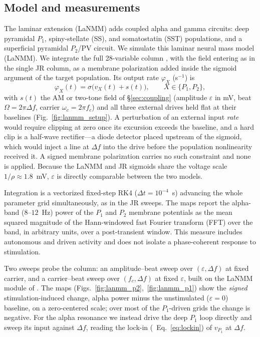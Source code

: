 \documentclass[11pt,a4paper]{article}
\newif\ifsupp
\newcommand{\Sig}{\sigma}
\begin{document}
\subsection{Model and measurements}\label{sec:lanmm-methods}
The laminar extension (LaNMM)
\cite{ruffini2025cfc,sanchezTodo2023} adds coupled alpha and gamma circuits: deep
pyramidal $P_1$, spiny-stellate (SS), and somatostatin (SST) populations, and a
superficial pyramidal $P_2$/PV circuit.
We simulate this laminar neural mass model (LaNMM). We integrate the full 28-variable column
\cite{ruffini2025cfc,sanchezTodo2023}, with the field entering as in the single
JR column, as a membrane polarization added inside the sigmoid argument of the target
population. Its output rate $\varphi_X$ (s$^{-1}$) is
\begin{equation}
\varphi_X(t)=\Sig\!\big(v_X(t)+s(t)\big),\qquad X\in\{P_1,P_2\},
\label{eq:lanmm_drive}
\end{equation}
with $s(t)$ the AM or two-tone field of \S\ref{sec:coupling} (amplitude $\varepsilon$ in
mV, beat $\Omega=2\pi\Delta f$, carrier $\omega_c=2\pi f_c$) and all three external drives
held flat at their baselines (Fig.~\ref{fig:lanmm_setup}). A perturbation of an external
input \emph{rate} would require clipping at zero
once its excursion exceeds the baseline, and a hard clip is a half-wave rectifier---a
diode detector placed upstream of the sigmoid, which would inject a line at $\Delta f$
into the drive before the population nonlinearity received it. A signed membrane
polarization carries no such constraint and none is applied. Because the LaNMM and JR
sigmoids share the voltage scale $1/\rho\approx1.8$~mV, $\varepsilon$ is directly
comparable between the two models.

Integration is a vectorized fixed-step RK4
($\Delta t=10^{-4}$~s) advancing the whole parameter grid simultaneously, as in the JR
sweeps. The maps report the
alpha-band ($8$--$12$~Hz) power of the $P_1$ and $P_2$ membrane potentials as the mean
squared magnitude of the Hann-windowed fast Fourier transform (FFT) over the band, in arbitrary units, over a
post-transient window. This measure includes autonomous and driven activity and
does not isolate a phase-coherent response to stimulation.

Two sweeps probe the column: an amplitude--beat sweep over
$(\varepsilon,\Delta f)$ at fixed carrier, and a carrier--beat sweep
over $(f_c,\Delta f)$ at fixed $\varepsilon$, built on the LaNMM module of
\cite{ruffini2025cfc}. The maps
(Figs.~\ref{fig:lanmm_p2},~\ref{fig:lanmm_p1}) show the \emph{signed} stimulation-induced
change, alpha power minus the unstimulated ($\varepsilon=0$) baseline, on a zero-centered
scale; over most of the $P_1$-driven grids the change is negative. For the
alpha resonance we instead drive the deep $P_1$ loop directly and sweep its input against
$\Delta f$, reading the lock-in (\ifsupp main-text\fi\ Eq.~\eqref{eq:lockin}) of $v_{P_1}$ at $\Delta f$.
\end{document}
